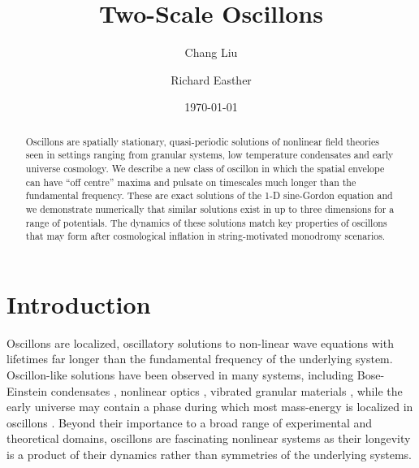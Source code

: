 \documentclass[%
reprint,
superscriptaddress,
amsmath,amssymb,
aps,
prd,
floatfix,
nofootinbib
]{revtex4-1}
\begin{document}
\title{Two-Scale Oscillons}
\author{Chang Liu}
\author{Richard Easther}

\date{\today}

\begin{abstract} \noindent
Oscillons are spatially stationary, quasi-periodic solutions of nonlinear field theories seen in settings ranging from granular systems, low temperature condensates and  early universe cosmology. We describe a new class of oscillon in which the spatial envelope can have ``off centre'' maxima and pulsate on timescales much longer than the fundamental frequency. These  are exact solutions of the 1-D sine-Gordon equation and we demonstrate numerically that similar solutions exist in up to three dimensions for a range of potentials. The dynamics of these solutions match key properties of  oscillons that may form after cosmological inflation in string-motivated monodromy scenarios.
\end{abstract}

\maketitle

\section{Introduction}

Oscillons are localized, oscillatory solutions to non-linear wave equations with  lifetimes far longer than the  fundamental frequency of the underlying system. Oscillon-like solutions have been observed in many systems, including Bose-Einstein condensates \cite{PhysRevA.91.023631}, nonlinear optics \cite{PhysRevLett.108.093901}, vibrated granular materials \cite{Copeland:1995fq,Tsimring:1997zz}, while the  early universe may contain a phase during which most mass-energy is localized in oscillons   \cite{Copeland:1995fq,Hindmarsh:2006ur,Hindmarsh:2007jb,Amin:2010dc,Amin:2010xe,Gleiser:2011xj,Amin:2011hj,Zhou:2013tsa,Amin:2013ika}. Beyond their importance to a broad range of experimental and theoretical domains, oscillons are fascinating  nonlinear systems as their longevity is a product of their  dynamics \cite{Copeland:1995fq,PhysRevD.80.125037} rather than  symmetries of the underlying systems.     
\end{document}
